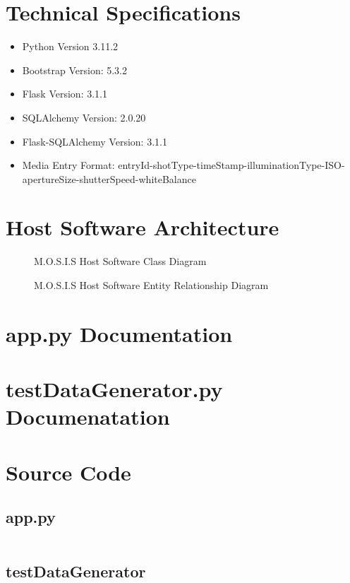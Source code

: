 \documentclass[12pt]{article}
\begin{document}
\section{Technical Specifications}
\begin{itemize}
	\item Python Version 3.11.2
	\item Bootstrap Version: 5.3.2
	\item Flask Version: 3.1.1
	\item SQLAlchemy Version: 2.0.20
	\item Flask-SQLAlchemy Version: 3.1.1
	\item Media Entry Format: entryId-shotType-timeStamp-illuminationType-ISO-apertureSize-shutterSpeed-whiteBalance
\end{itemize}
\section{Host Software Architecture}
\begin{figure}[H]
	\caption{M.O.S.I.S Host Software Class Diagram}
\end{figure}
\begin{figure}[H]
	\caption{M.O.S.I.S Host Software Entity Relationship Diagram}
\end{figure}
\section{app.py Documentation}

\section{testDataGenerator.py Documenatation}

\section{Source Code}
\subsection{app.py}
\inputminted{python}{../../../App/app.py}
\subsection{testDataGenerator}
\inputminted{python}{../../../App/testDataGenerator.py}
\end{document}
